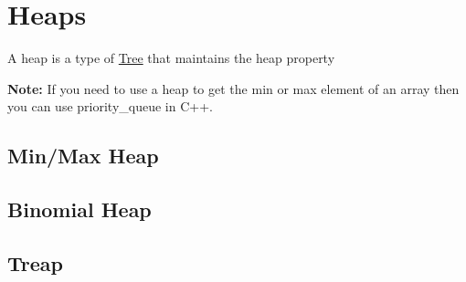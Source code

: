 \section{Heaps} \label{heaps}
A heap is a type of \hyperref[trees]{Tree} that maintains the heap property

\noindent \textbf{Note:} If you need to use a heap to get the min or max element of an array then you can use priority\_queue in C++.

\subsection{Min/Max Heap}


\subsection{Binomial Heap}


\subsection{Treap}
